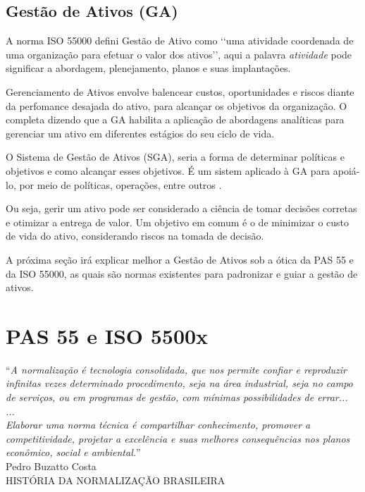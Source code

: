 \subsection{Gestão de Ativos (GA)}

A norma ISO 55000 defini Gestão de Ativo como \lq\lq uma atividade coordenada de uma organização para efetuar o valor dos ativos\rq\rq, aqui a palavra \emph{atividade} pode significar a abordagem, plenejamento, planos e suas implantações. 

Gerenciamento de Ativos envolve balencear custos, oportunidades e riscos diante da perfomance desajada do ativo, para alcançar os objetivos da organização. O \cite{iam} completa dizendo que a GA habilita a aplicação de abordagens analíticas para gerenciar um ativo em diferentes estágios do seu ciclo de vida.

O Sistema de Gestão de Ativos (SGA), seria a forma de determinar políticas e objetivos e como alcançar esses objetivos. É um sistem aplicado à GA para apoiá-lo, por meio de políticas, operações, entre outros \cite{abraman}. 

Ou seja, gerir um ativo pode ser considerado a ciência de tomar decisões corretas e otimizar a entrega de valor. Um objetivo em comum é o de minimizar o custo de vida do ativo, considerando riscos na tomada de decisão.

A próxima seção irá explicar melhor a Gestão de Ativos sob a ótica da PAS 55 e da ISO 55000, as quais são normas existentes para padronizar e guiar a gestão de ativos.

\section{PAS 55 e ISO 5500x}

\begin{flushright}
	“\textit{A normalização é tecnologia consolidada, que nos
permite confiar e reproduzir infinitas vezes determinado
procedimento, seja na área industrial, seja no campo de
serviços, ou em programas de gestão, com mínimas
possibilidades de errar...
\\
...
\\
Elaborar uma norma técnica é compartilhar
conhecimento, promover a competitividade, projetar a
excelência e suas melhores consequências nos planos
econômico, social e ambiental.}”
\\
Pedro Buzatto Costa
\\
HISTÓRIA DA NORMALIZAÇÃO BRASILEIRA
\end{flushright}

